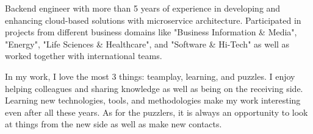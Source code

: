 

\begin{cvparagraph}

Backend engineer with more than 5 years of experience in developing and enhancing cloud-based solutions with microservice architecture. Participated in projects from different business domains like "Business Information \& Media", "Energy", "Life Sciences \& Healthcare", and "Software \& Hi-Tech" as well as worked together with international teams.

In my work, I love the most 3 things: teamplay, learning, and puzzles.
 I enjoy helping colleagues and sharing knowledge as well as being on the receiving side. Learning new technologies, tools, and methodologies make my work interesting even after all these years. As for the puzzlers,
 it is always an opportunity to look at things from the new side as well as make new contacts.

\end{cvparagraph}
